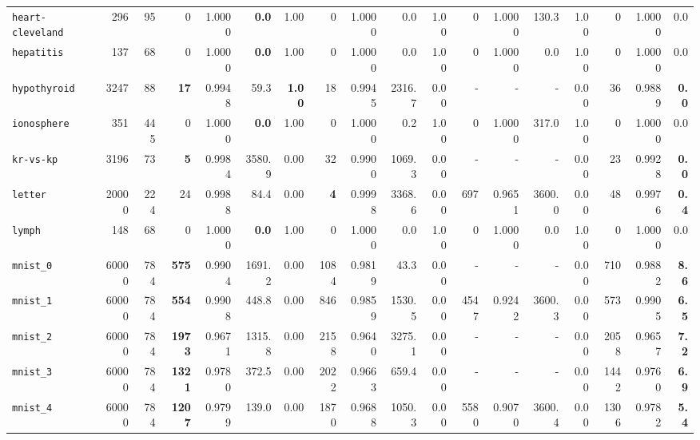 \begin{tabular}{lccrrrrrrrrrrrrrrr}
\texttt{heart-cleveland} & \multicolumn{1}{r}{296} & \multicolumn{1}{r}{95}  & 0 & 1.0000 & \textbf{0.0} & 1.00 & 0 & 1.0000 & 0.0 & 1.00 & 0 & 1.0000 & 130.3 & 1.00 & 0 & 1.0000 & 0.0\\
\texttt{hepatitis} & \multicolumn{1}{r}{137} & \multicolumn{1}{r}{68}  & 0 & 1.0000 & \textbf{0.0} & 1.00 & 0 & 1.0000 & 0.0 & 1.00 & 0 & 1.0000 & 0.0 & 1.00 & 0 & 1.0000 & 0.0\\
\texttt{hypothyroid} & \multicolumn{1}{r}{3247} & \multicolumn{1}{r}{88}  & \textbf{17} & 0.9948 & 59.3 & \textbf{1.00} & 18 & 0.9945 & 2316.7 & 0.00 & - & - & - & 0.00 & 36 & 0.9889 & \textbf{0.0}\\
\texttt{ionosphere} & \multicolumn{1}{r}{351} & \multicolumn{1}{r}{445}  & 0 & 1.0000 & \textbf{0.0} & 1.00 & 0 & 1.0000 & 0.2 & 1.00 & 0 & 1.0000 & 317.0 & 1.00 & 0 & 1.0000 & 0.0\\
\texttt{kr-vs-kp} & \multicolumn{1}{r}{3196} & \multicolumn{1}{r}{73}  & \textbf{5} & 0.9984 & 3580.9 & 0.00 & 32 & 0.9900 & 1069.3 & 0.00 & - & - & - & 0.00 & 23 & 0.9928 & \textbf{0.0}\\
\texttt{letter} & \multicolumn{1}{r}{20000} & \multicolumn{1}{r}{224}  & 24 & 0.9988 & 84.4 & 0.00 & \textbf{4} & 0.9998 & 3368.6 & 0.00 & 697 & 0.9651 & 3600.0 & 0.00 & 48 & 0.9976 & \textbf{0.4}\\
\texttt{lymph} & \multicolumn{1}{r}{148} & \multicolumn{1}{r}{68}  & 0 & 1.0000 & \textbf{0.0} & 1.00 & 0 & 1.0000 & 0.0 & 1.00 & 0 & 1.0000 & 0.0 & 1.00 & 0 & 1.0000 & 0.0\\
\texttt{mnist\_0} & \multicolumn{1}{r}{60000} & \multicolumn{1}{r}{784}  & \textbf{575} & 0.9904 & 1691.2 & 0.00 & 1084 & 0.9819 & 43.3 & 0.00 & - & - & - & 0.00 & 710 & 0.9882 & \textbf{8.6}\\
\texttt{mnist\_1} & \multicolumn{1}{r}{60000} & \multicolumn{1}{r}{784}  & \textbf{554} & 0.9908 & 448.8 & 0.00 & 846 & 0.9859 & 1530.5 & 0.00 & 4547 & 0.9242 & 3600.3 & 0.00 & 573 & 0.9905 & \textbf{6.5}\\
\texttt{mnist\_2} & \multicolumn{1}{r}{60000} & \multicolumn{1}{r}{784}  & \textbf{1973} & 0.9671 & 1315.8 & 0.00 & 2158 & 0.9640 & 3275.1 & 0.00 & - & - & - & 0.00 & 2058 & 0.9657 & \textbf{7.2}\\
\texttt{mnist\_3} & \multicolumn{1}{r}{60000} & \multicolumn{1}{r}{784}  & \textbf{1321} & 0.9780 & 372.5 & 0.00 & 2022 & 0.9663 & 659.4 & 0.00 & - & - & - & 0.00 & 1442 & 0.9760 & \textbf{6.9}\\
\texttt{mnist\_4} & \multicolumn{1}{r}{60000} & \multicolumn{1}{r}{784}  & \textbf{1207} & 0.9799 & 139.0 & 0.00 & 1870 & 0.9688 & 1050.3 & 0.00 & 5580 & 0.9070 & 3600.4 & 0.00 & 1306 & 0.9782 & \textbf{5.4}\\

\end{tabular}
